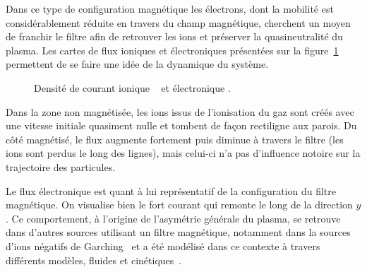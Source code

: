 \begin{refsection}
Dans ce type de configuration
magnétique les électrons, dont la mobilité est considérablement réduite en
travers du champ magnétique, cherchent un moyen de franchir le filtre afin de
retrouver les ions et préserver la quasineutralité du plasma. Les cartes de flux
ioniques et électroniques présentées sur la figure~\ref{4-PegasesCarteFlux}
permettent de se faire une idée de la dynamique du système. 

\begin{figure}[!htbp]
  \centering
    \caption{Densité de courant ionique ~
    et électronique .}
    \label{4-PegasesCarteFlux}
\end{figure}

Dans la zone non
magnétisée, les ions issus de l'ionisation du gaz sont créés avec une vitesse
initiale quasiment nulle et tombent de façon rectiligne aux parois. Du côté
magnétisé, le flux augmente fortement puis diminue à travers le filtre (les
ions sont perdus le long des lignes), mais celui-ci n'a pas d'influence notoire
sur la trajectoire des particules.

Le flux électronique est quant à lui représentatif de la configuration du filtre
magnétique. On visualise bien le fort courant qui
remonte le long de la direction $y$. Ce comportement, à l'origine de l'asymétrie
générale du plasma, se retrouve dans d'autres sources utilisant un filtre
magnétique, notamment dans la sources d'ions négatifs de
Garching~\parencite{Fantz} et a été modélisé dans ce contexte à travers
différents modèles, fluides et cinétiques~\parencite{PIC2D,PIC3D,MAGMA}.


\end{refsection}
